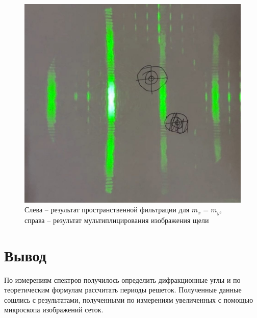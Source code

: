 \documentclass[12pt, a4paper]{article}
\begin{document}
\begin{figure}[H]
\begin{minipage}{0.3\textwidth}
    \end{minipage}
    \begin{minipage}{0.3\textwidth}
        \centering
        \includegraphics[height=\textwidth]{pics/mult.jpg}

    \end{minipage}
    \begin{minipage}{0.2\textwidth}

    \end{minipage}
    \hfill
    \caption{Слева -- результат пространственной фильтрации для $m_x = m_y$,
        справа -- результат мультиплицирования изображения щели}
\end{figure}
\section{Вывод}

По измерениям спектров получилось определить дифракционные углы и по
теоретическим формулам рассчитать периоды решеток. Полученные данные сошлись с
результатами, полученными по измерениям увеличенных с помощью микроскопа
изображений сеток.
\end{document}

